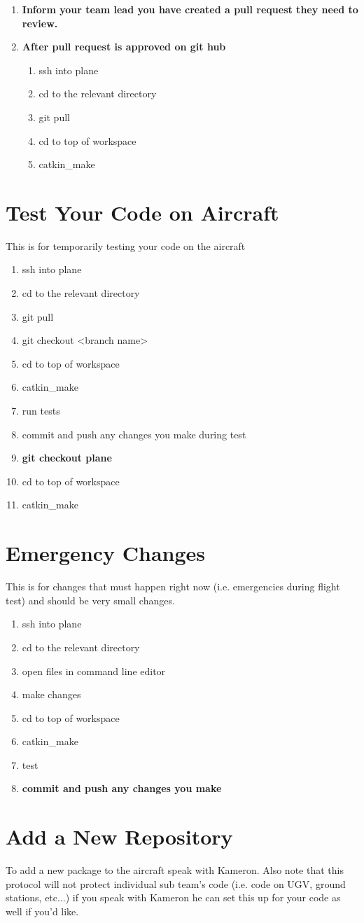 \documentclass[]{auvsi_doc}
\begin{document}
\begin{enumerate}
\begin{enumerate}
	\end{enumerate}
	\item \textbf{Inform your team lead you have created a pull request they need to review.}
	\item \textbf{After pull request is approved on git hub}
	\begin{enumerate}
		\item ssh into plane
		\item cd to the relevant directory
		\item git pull
		\item cd to top of workspace
		\item catkin\_make
	\end{enumerate}
\end{enumerate}

\section{Test Your Code on Aircraft}
This is for temporarily testing your code on the aircraft
\begin{enumerate}
	\item ssh into plane
	\item cd to the relevant directory
	\item git pull
	\item git checkout \textless branch name\textgreater
	\item cd to top of workspace
	\item catkin\_make
	\item run tests
	\item commit and push any changes you make during test
	\item \textbf{git checkout plane}
	\item cd to top of workspace
	\item catkin\_make
\end{enumerate}

\section{Emergency Changes}
This is for changes that must happen right now (i.e. emergencies during flight test) and should be very small changes.
\begin{enumerate}
	\item ssh into plane
	\item cd to the relevant directory
	\item open files in command line editor
	\item make changes
	\item cd to top of workspace
	\item catkin\_make
	\item test
	\item \textbf{commit and push any changes you make}
\end{enumerate}

\section{Add a New Repository}
To add a new package to the aircraft speak with Kameron. Also note that this protocol will not protect individual sub team's code (i.e. code on UGV, ground stations, etc...) if you speak with Kameron he can set this up for your code as well if you'd like.
\end{document}
